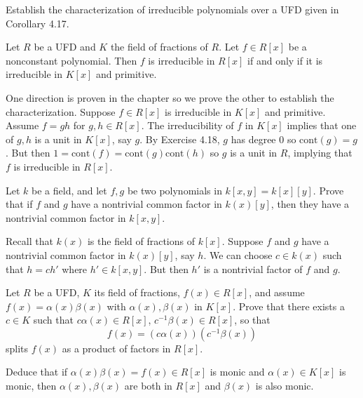 \documentclass[../../master.tex]{subfiles}
\begin{document}
    \begin{problem}
        Establish the characterization of irreducible polynomials over a UFD
        given in Corollary 4.17.
        \begin{proposition}[Corollary 4.17]
            Let $R$ be a UFD and $K$ the field of fractions of $R$. Let $f \in
            R[x]$ be a nonconstant polynomial. Then $f$ is irreducible in
            $R[x]$ if and only if it is irreducible in $K[x]$ and primitive.
        \end{proposition}
    \end{problem}

    \begin{solution}
        One direction is proven in the chapter so we prove the other to
        establish the characterization. Suppose $f \in R[x]$ is irreducible in
        $K[x]$ and primitive. Assume $f = gh$ for $g, h \in R[x]$. The
        irreducibility of $f$ in $K[x]$ implies that one of $g, h$ is a unit in
        $K[x]$, say $g$. By Exercise 4.18, $g$ has degree 0 so $\text{cont}(g) = g$.
        But then $1 = \text{cont}(f) = \text{cont}(g) \text{cont}(h)$ so $g$ is
        a unit in $R$, implying that $f$ is irreducible in $R[x]$.
    \end{solution}

    \begin{problem}
        Let $k$ be a field, and let $f, g$ be two polynomials in $k[x, y] =
        k[x][y]$. Prove that if $f$ and $g$ have a nontrivial common factor in
        $k(x)[y]$, then they have a nontrivial common factor in $k[x, y]$.
    \end{problem}

    \begin{solution}
        Recall that $k(x)$ is the field of fractions of $k[x]$. Suppose $f$ and
        $g$ have a nontrivial common factor in $k(x)[y]$, say $h$. We can choose
        $c \in k(x)$ such that $h = ch'$ where $h' \in k[x, y]$. But then $h'$
        is a nontrivial factor of $f$ and $g$.
    \end{solution}

    \begin{problem}
        Let $R$ be a UFD, $K$ its field of fractions, $f(x) \in R[x]$, and
        assume $f(x) = \alpha(x) \beta(x)$ with $\alpha(x), \beta(x)$ in $K[x]$.
        Prove that there exists a $c \in K$ such that $c\alpha(x) \in R[x]$,
        $c^{-1}\beta(x) \in R[x]$, so that
        \[
            f(x) = (c\alpha(x))(c^{-1}\beta(x))
        \] 
        splits $f(x)$ as a product of factors in $R[x]$.

        Deduce that if $\alpha(x)\beta(x) = f(x) \in R[x]$ is monic and
        $\alpha(x) \in K[x]$ is monic, then $\alpha(x), \beta(x)$ are both in
        $R[x]$ and $\beta(x)$ is also monic.
    \end{problem}
\end{document}
